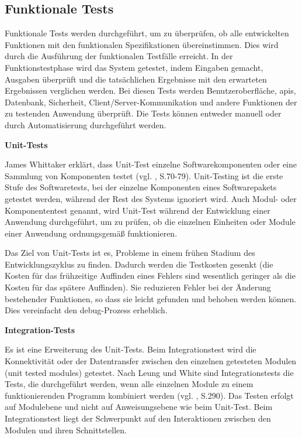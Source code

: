\subsection{Funktionale Tests}

Funktionale Tests werden durchgeführt, um zu überprüfen,
ob alle entwickelten Funktionen mit den funktionalen
Spezifikationen übereinstimmen. Dies wird durch die
Ausführung der funktionalen Testfälle erreicht. In der
Funktionstestphase wird das System getestet, indem
Eingaben gemacht, Ausgaben überprüft und die
tatsächlichen Ergebnisse mit den erwarteten
Ergebnissen verglichen werden. Bei diesen Tests werden
Benutzeroberfläche, \acs{api}s, Datenbank, Sicherheit,
Client/Server-Kommunikation und andere Funktionen der zu
testenden Anwendung überprüft. Die Tests können entweder
manuell oder durch Automatisierung durchgeführt werden.

\textbf{Unit-Tests}

James Whittaker erklärt, dass Unit-Test einzelne Softwarekomponenten oder
eine Sammlung von Komponenten testet (vgl. \cite{Whittaker2000}, S.70-79).
Unit-Testing ist die erste Stufe des Softwaretests, bei der einzelne
Komponenten eines Softwarepakets getestet werden, während der Rest des
Systems ignoriert wird. Auch Modul- oder Komponententest genannt,
wird Unit-Test während der Entwicklung einer Anwendung durchgeführt,
um zu prüfen, ob die einzelnen Einheiten oder Module einer Anwendung
ordnungsgemäß funktionieren.


Das Ziel von Unit-Tests ist es, Probleme in einem frühen Stadium des
Entwicklungszyklus zu finden. Dadurch werden die Testkosten gesenkt
(die Kosten für das frühzeitige Auffinden eines Fehlers sind wesentlich
geringer als die Kosten für das spätere Auffinden). Sie reduzieren Fehler
bei der Änderung bestehender Funktionen, so dass sie leicht gefunden und
behoben werden können. Dies vereinfacht den \gls{debug}-Prozess erheblich.


\textbf{Integration-Tests}

Es ist eine Erweiterung des Unit-Tests. Beim Integrationstest wird die
Konnektivität oder der Datentransfer zwischen den einzelnen getesteten
Modulen (unit tested modules) getestet. Nach Leung und White sind
Integrationstests die Tests, die durchgeführt werden, wenn alle
einzelnen Module zu einem funktionierenden Programm kombiniert
werden (vgl. \cite{131377}, S.290). Das Testen erfolgt auf Modulebene und nicht
auf Anweisungsebene wie beim Unit-Test. Beim Integrationstest liegt der
Schwerpunkt auf den Interaktionen zwischen den Modulen und ihren
Schnittstellen.


